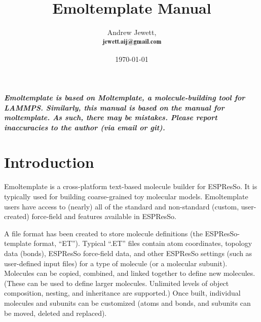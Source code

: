 \documentclass[11pt]{article}
\begin{document}
\author{
  Andrew Jewett, \\
\includegraphics[height=0.3cm]{author_email.png}
}
\date \today


\title{Emoltemplate Manual}



\maketitle

  \textit{\textbf{Emoltemplate is based on Moltemplate, a molecule-building tool for LAMMPS.  Similarly, this manual is based on the manual for moltemplate.  As such, there may be mistakes.  Please report inaccuracies to the author (via email or git).}}

\tableofcontents


\section{Introduction}

 Emoltemplate is a cross-platform text-based molecule builder for ESPResSo. It is typically used for building coarse-grained toy molecular models. Emoltemplate users have access to (nearly) all of the standard and non-standard (custom, user-created) force-field and features available in ESPResSo.


A file format has been created to store molecule definitions (the ESPResSo-template format, ``ET''). Typical ``.ET'' files contain atom coordinates, topology data (bonds), ESPResSo force-field data, and other ESPResSo settings (such as user-defined input files) for a type of molecule (or a molecular subunit).  Molecules can be copied, combined, and linked together to define new molecules. (These can be used to define larger molecules. Unlimited levels of object composition, nesting, and inheritance are supported.) Once built, individual molecules and subunits can be customized (atoms and bonds, and subunits can be moved, deleted and replaced).
\end{document}
